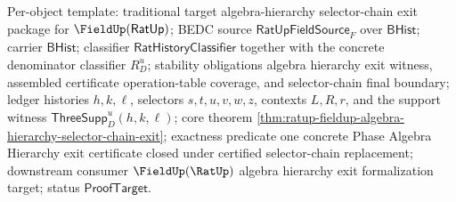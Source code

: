 Per-object template: traditional target algebra-hierarchy selector-chain exit
package for $\FieldUp(\mathsf{RatUp})$; BEDC source
$\mathsf{RatUpFieldSource}_F$ over $\mathsf{BHist}$; carrier $\mathsf{BHist}$;
classifier $\mathsf{RatHistoryClassifier}$ together with the concrete
denominator classifier $R_D^u$; stability obligations algebra hierarchy exit
witness, assembled certificate operation-table coverage, and selector-chain
final boundary; ledger histories $h,k,\ell$, selectors $s,t,u,v,w,z$, contexts
$L,R,r$, and the support witness $\mathsf{ThreeSupp}_D^u(h,k,\ell)$; core
theorem
\autoref{thm:ratup-fieldup-algebra-hierarchy-selector-chain-exit}; exactness
predicate one concrete Phase Algebra Hierarchy exit certificate closed under
certified selector-chain replacement; downstream consumer
$\FieldUp(\RatUp)$ algebra hierarchy exit formalization target; status
$\mathsf{ProofTarget}$.
